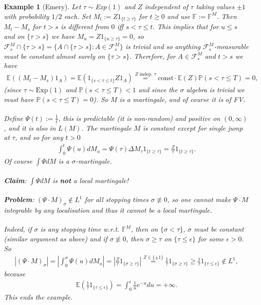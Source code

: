 \documentclass[12pt,a4paper, twoside]{article}
\newtheorem{exmp}{Example}[section]
\theoremstyle{definition}
\newcommand{\EE}{\mathbb{E}} %
\newcommand{\PP}{\mathbb{P}} %
\begin{document}
\newpage
\begin{exmp}[Emery] Let $\tau \sim $Exp$(1)$ and $Z$ independent of $\tau$ taking values $\pm 1$ with probability $1/2$ each. Set $M_t:= Z 1_{\{ t \geq \tau\}}$ for $t \geq 0$ and use $\mathbb{F}:= \mathbb{F}^M$. Then $M_t-M_s$ for $t > s$ is different from $0$ iff $s < \tau \leq t$. This implies that for $u \leq s$ and on $\{ \tau >s\}$ we have $M_u = Z 1_{\{u \geq \tau\}}=0$, so $\mathcal{F}_s^M \cap \{ \tau >s \}= \{ A \cap \{ \tau >s\}: A \in \mathcal{F}_s^M\}$ is trivial and so anything $\mathcal{F}_s^M$-measurable must be constant almost surely on $\{ \tau > s\}$. Therefore, for $A \in \mathcal{F}_s^M$ and $t >s$ we have
\begin{align*}
\EE((M_t-M_s)1_A)=\EE(1_{\{s < \tau \leq t\}} Z 1_A) \overset{Z \text{ indep. } \tau}{=} \text{const} \cdot \EE(Z) \PP( s < \tau \leq T) =0, 
\end{align*}
(since $\tau \sim \text{Exp}(1)$ and $\PP(s < \tau \leq T) < 1$ and since the $\sigma$ algebra is trivial we must have $\PP(s < \tau \leq T)=0$). So $M$ is  a martingale, and of course it is of FV.
\\\\
Define $\Psi(t):= \frac{1}{t}$, this is predictable (it is non-random) and positive on $(0, \infty)$, and it is also in $L(M)$. The martingale $M$ is constant except for single jump at $\tau$, and so for any $t >0$ 
\begin{align*}
\int_0^t \Psi(u) dM_u = \Psi( \tau) \Delta M_\tau 1_{\{ t \geq \tau\}} = \frac{Z}{\tau}1_{\{ t \geq \tau\}}.
\end{align*}
Of course $\int \Psi dM$ is a $\sigma$-martingale. 
\\\\
\textbf{Claim}: $\int \Psi dM$ is \textbf{not} a local martingale!
\\\\
\textbf{Problem}: $( \Psi \cdot M)_\sigma \notin L^1$ for all stopping times $\sigma \not\equiv 0$, so one cannot make $\Psi \cdot M$ integrable by any localisation and thus it cannot be a local martingale. 
\\\\
Indeed, if $\sigma$ is any stopping time w.r.t. $\mathbb{F}^M$, then on $\{ \sigma < \tau\}$, $\sigma$ must be constant (similar argument as above) and if $\sigma \not\equiv 0$, then $\sigma \geq \tau$ on $\{\tau \leq \epsilon\}$ for some $\epsilon >0$. So
\begin{align*}
\left| ( \Psi \cdot M )_\sigma \right| = \left| \int_0^\sigma \Psi(u) dM_u \right| = \left| \frac{Z}{\tau}1_{\{ \sigma \geq \tau\}} \right| \overset{Z \in \{\pm 1\}}= \frac{1}{\tau} 1_{\{ \sigma \geq \tau\}} \geq \frac{1}{\tau}1_{\{ \tau \leq \epsilon\}} \notin L^1,
\end{align*}
because
\begin{align*}
\EE \left( \frac{1}{\tau}1_{\{ \tau \leq \epsilon\}} \right) = \int_0^\epsilon \frac{1}{u}e^{-u} du = + \infty.
\end{align*}
This ends the example.
\end{exmp}
\end{document}
